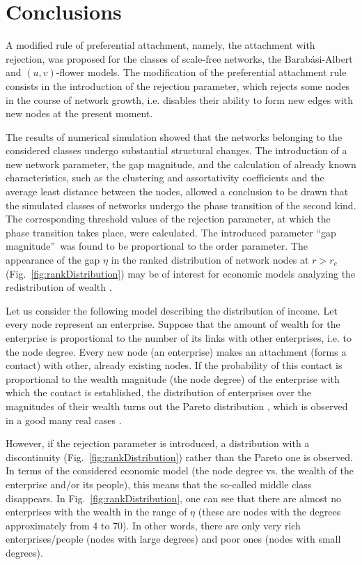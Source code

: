 \documentclass[aps,preprint]{revtex4}%
\begin{document}
\section{Conclusions}

A modified rule of preferential attachment, namely, the attachment with
rejection, was proposed for the classes of scale-free networks, the
Barab\'{a}si-Albert and $(u,v)$-flower models. The modification of the
preferential attachment rule consists in the introduction of the rejection
parameter, which rejects some nodes in the course of network growth, i.e.
disables their ability to form new edges with new nodes at the present moment.

The results of numerical simulation showed that the networks belonging to the
considered classes undergo substantial structural changes. The introduction of
a new network parameter, the gap magnitude, and the calculation of already
known characteristics, such as the clustering and assortativity coefficients
and the average least distance between the nodes, allowed a conclusion to be
drawn that the simulated classes of networks undergo the phase transition of
the second kind. The corresponding threshold values of the rejection
parameter, at which the phase transition takes place, were calculated. The
introduced parameter \textquotedblleft gap magnitude\textquotedblright\ was
found to be proportional to the order parameter. The appearance of the gap
$\eta$ in the ranked distribution of network nodes at $r>r_{c}$
(Fig.~\ref{fig:rankDistribution}) may be of interest for economic models
analyzing the redistribution of wealth \cite{Economics2}.

Let us consider the following model describing the distribution of income. Let
every node represent an enterprise. Suppose that the amount of wealth for the
enterprise is proportional to the number of its links with other enterprises,
i.e. to the node degree. Every new node (an enterprise) makes an attachment
(forms a contact) with other, already existing nodes. If the probability of
this contact is proportional to the wealth magnitude (the node degree) of the
enterprise with which the contact is established, the distribution of
enterprises over the magnitudes of their wealth turns out the Pareto
distribution \cite{Economics2, Economics1}, which is observed in a good many
real cases \cite{Economics1}.

However, if the rejection parameter is introduced, a distribution with a
discontinuity (Fig.~\ref{fig:rankDistribution}) rather than the Pareto one is
observed. In terms of the considered economic model (the node degree vs. the
wealth of the enterprise and/or its people), this means that the so-called
middle class disappears. In Fig.~\ref{fig:rankDistribution}, one can see that
there are almost no enterprises with the wealth in the range of $\eta$ (these
are nodes with the degrees approximately from 4 to 70). In other words, there
are only very rich enterprises/people (nodes with large degrees) and poor ones
(nodes with small degrees).
\end{document}
